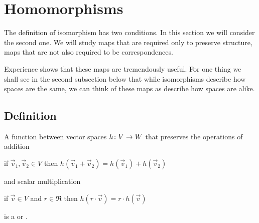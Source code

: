 \section{Homomorphisms}
The definition of isomorphism has two conditions.
In this section we will consider the second one.
We will study maps that 
are required only to preserve structure,
maps that are not also required to be correspondences. 

Experience shows that these maps are 
tremendously useful.
For one thing we shall see in the second subsection below
that while isomorphisms describe how spaces are the same,
we can think of these maps as describe how spaces are alike.








\subsection{Definition}

\begin{definition}  \label{def:Homo}
A function between vector spaces \( \mbox{$h\colon V\to W$} \) that 
preserves 
the operations of addition
\begin{center}
  if \( \vec{v}_1,\vec{v}_2\in V \) then
      \( h(\vec{v}_1+\vec{v}_2)=h(\vec{v}_1)+h(\vec{v}_2) \)
\end{center}
and scalar multiplication
\begin{center}
      if \( \vec{v}\in V \) and \( r\in\Re \) then
      \( h(r\cdot\vec{v})=r\cdot h(\vec{v}) \)
\end{center}
is a %
%
or .
\end{definition}

